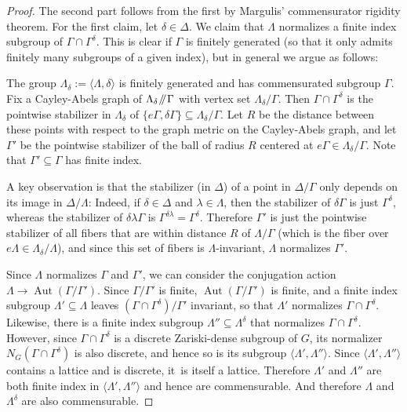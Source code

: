 \documentclass[JEP,XML,SOM,Unicode,published]{cedram}
\newcommand{\sslash}{\mathbin{\mkern-3mu /\mkern-5mu/ \mkern-3mu}}
\DeclareMathOperator{\Aut}{Aut}
\theoremstyle{definition}
\begin{document}
\begin{proof} The second part follows from the first by Margulis' commensurator rigidity theorem. For the first claim, let $\delta\in\Delta$. We claim that $\Lambda$ normalizes a finite index subgroup of $\Gamma\cap\Gamma^\delta$. This is clear if $\Gamma$ is finitely generated (so that it only admits finitely many subgroups of a given index), but in general we argue as follows:

The group $\Lambda_\delta:=\langle \Lambda,\delta\rangle$ is finitely generated and has commensurated subgroup $\Gamma$. Fix a Cayley-Abels graph of $\Lambda_\delta\sslash\Gamma$ with vertex set $\Lambda_\delta/\Gamma$. Then $\Gamma\cap\Gamma^\delta$ is the pointwise stabilizer in $\Lambda_\delta$ of $\{e\Gamma,\delta\Gamma\}\subseteq \Lambda_\delta/\Gamma$. Let $R$ be the distance between these points with respect to the graph metric on the Cayley-Abels graph, and let $\Gamma'$ be the pointwise stabilizer of the ball of radius $R$ centered at $e\Gamma \in \Lambda_\delta/\Gamma$. Note that $\Gamma'\subseteq \Gamma$ has finite index.

A key observation is that the stabilizer (in $\Delta$) of a point in $\Delta/\Gamma$ only depends on its image in $\Delta/\Lambda$: Indeed, if $\delta\in\Delta$ and $\lambda\in\Lambda$, then the stabilizer of $\delta\Gamma$ is just $\Gamma^\delta$, whereas the stabilizer of $\delta\lambda\Gamma$ is $\Gamma^{\delta\lambda}=\Gamma^\delta$. Therefore $\Gamma'$ is just the pointwise stabilizer of all fibers that are within distance $R$ of $\Lambda/\Gamma$ (which is the fiber over $e\Lambda\in\Lambda_\delta/\Lambda$), and since this set of fibers is $\Lambda$-invariant, $\Lambda$ normalizes $\Gamma'$.

Since $\Lambda$ normalizes $\Gamma$ and $\Gamma'$, we can consider the conjugation action $\Lambda\to\Aut(\Gamma/\Gamma')$. Since $\Gamma/\Gamma'$ is finite, $\Aut(\Gamma/\Gamma')$ is finite, and a finite index subgroup $\Lambda'\subseteq\Lambda$ leaves $(\Gamma\cap\Gamma^\delta)/\Gamma'$ invariant, so that $\Lambda'$ normalizes $\Gamma\cap\Gamma^\delta$. Likewise, there is a finite index subgroup $\Lambda''\subseteq \Lambda^\delta$ that normalizes $\Gamma\cap\Gamma^\delta$. However, since $\Gamma\cap\Gamma^\delta$ is a discrete Zariski-dense subgroup of $G$, its normalizer $N_G(\Gamma\cap\Gamma^\delta)$ is also discrete, and hence so is its subgroup $\langle \Lambda',\Lambda'' \rangle$. Since $\langle \Lambda', \Lambda''\rangle$ contains a lattice and is discrete, it~is itself a lattice. Therefore $\Lambda'$ and $\Lambda''$ are both finite index in $\langle \Lambda',\Lambda''\rangle$ and hence are commensurable. And therefore $\Lambda$ and $\Lambda^{\delta}$ are also commensurable. \end{proof}
\end{document}
